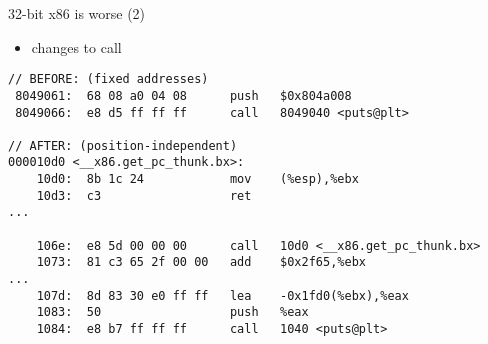 \begin{frame}[fragile,label=x86Worse2]{32-bit x86 is worse (2)}
    \begin{itemize}
    \item changes to call
    \end{itemize}
\lstset{
    language=myasm,
    style=smaller,
    escapeinside=~~,
}
\begin{lstlisting}
// BEFORE: (fixed addresses)
 8049061:  68 08 a0 04 08      push   $0x804a008
 8049066:  e8 d5 ff ff ff      call   8049040 <puts@plt>

// AFTER: (position-independent)
000010d0 <__x86.get_pc_thunk.bx>:
    10d0:  8b 1c 24            mov    (%esp),%ebx
    10d3:  c3                  ret
...

    106e:  e8 5d 00 00 00      call   10d0 <__x86.get_pc_thunk.bx>
    1073:  81 c3 65 2f 00 00   add    $0x2f65,%ebx
...
    107d:  8d 83 30 e0 ff ff   lea    -0x1fd0(%ebx),%eax
    1083:  50                  push   %eax
    1084:  e8 b7 ff ff ff      call   1040 <puts@plt>
\end{lstlisting}
\end{frame}



